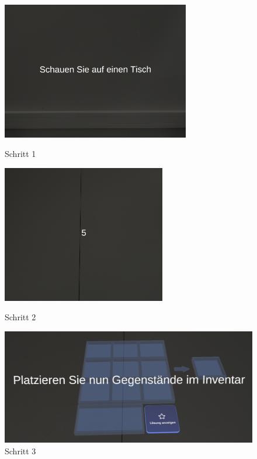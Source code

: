 \begin{itemize}
\begin{figure}[H]
    \centering
    \begin{minipage}[b]{0.48\textwidth}
        \centering
        \includegraphics[width=\textwidth, height=6cm]{images/schritteins.png}
        \caption{Schritt 1}
        \label{fig:eins}
    \end{minipage}
    \hfill
    \begin{minipage}[b]{0.48\textwidth}
        \centering
        \includegraphics[width=\textwidth, height=6cm]{images/schrittzwei.png}
        \caption{Schritt 2}
        \label{fig:zwei}
    \end{minipage}

    \vspace{0.5cm} %

    \begin{minipage}[b]{1\textwidth}
        \centering
        \includegraphics[width=1\textwidth]{images/schrittdrei.png}
        \caption{Schritt 3}
        \label{fig:drei}
    \end{minipage}
\end{figure}


\end{itemize}
